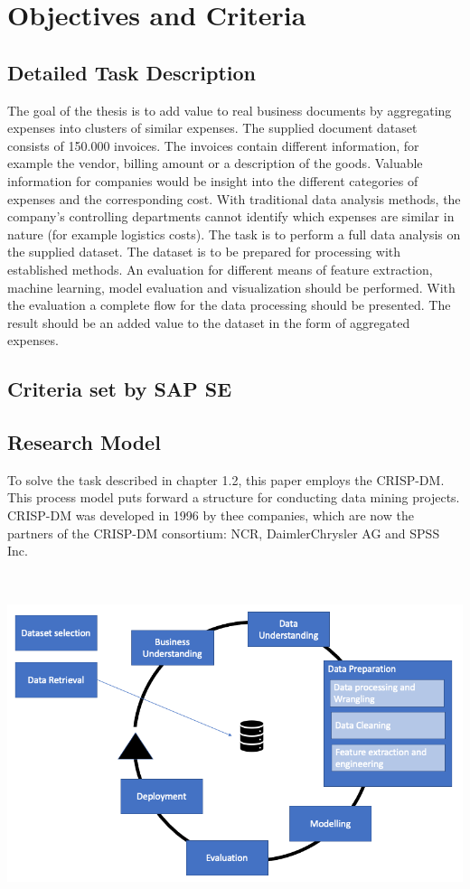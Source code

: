 \chapter{Objectives and Criteria}
\section{Detailed Task Description}
The goal of the thesis is to add value to real business documents by aggregating expenses into clusters of similar expenses. The supplied document dataset consists of 150.000 invoices. The invoices contain different information, for example the vendor, billing amount or a description of the goods. Valuable information for companies would be insight into the different categories of expenses and the corresponding cost. With traditional data analysis methods, the company’s controlling departments cannot identify which expenses are similar in nature (for example logistics costs). 
The task is to perform a full data analysis on the supplied dataset. The dataset is to be prepared for processing with established methods. An evaluation for different means of feature extraction, machine learning, model evaluation and visualization should be performed. With the evaluation a complete flow for the data processing should be presented. The result should be an added value to the dataset in the form of aggregated expenses.

\section{Criteria set by SAP SE}

\section{Research Model}
To solve the task described in chapter 1.2, this paper employs the \ac{CRISP-DM}. This process model \cite{CRISPDM2000} puts forward a structure for conducting data mining projects. \ac{CRISP-DM} was developed in 1996 by thee companies, which are now the partners of the \ac{CRISP-DM} consortium: NCR, DaimlerChrysler AG and SPSS Inc.

\includegraphics[height=10cm]{Bilder/Research_Model.png} 
